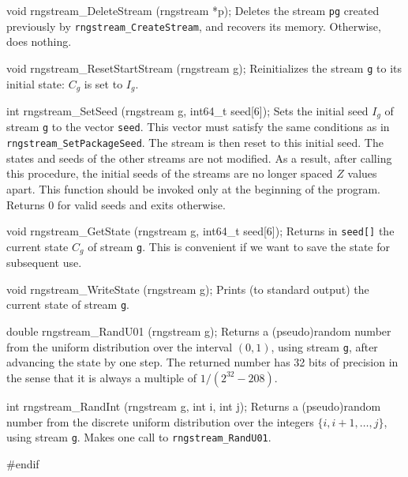 void rngstream_DeleteStream (rngstream *p);
\endcode
 \tab Deletes the stream {\tt *pg} created previously
  by {\tt rngstream\_CreateStream}, and recovers its memory.
  Otherwise, does nothing.
 \endtab
\code

void rngstream_ResetStartStream (rngstream g);
\endcode
 \tab Reinitializes the stream {\tt g} to its initial state:
   $C_g$ is set to $I_g$.
 \endtab
\code

int rngstream_SetSeed (rngstream g, int64_t seed[6]);
\endcode
 \tab  Sets the initial seed $I_g$ of stream {\tt g}
  to the vector {\tt seed}.  This vector must satisfy the same
  conditions as in {\tt rngstream\_SetPackageSeed}.
  The stream is then reset to this initial seed.
  The states and seeds of the other streams are not modified.
  As a result, after calling this procedure, the initial seeds
  of the streams are no longer spaced $Z$ values apart.
  This function should be invoked only at the beginning of the program.
  Returns 0 for valid seeds and exits otherwise.
 \endtab
\code

void rngstream_GetState (rngstream g, int64_t seed[6]);
\endcode
 \tab Returns in {\tt seed[]} the current state $C_g$ of stream {\tt g}.
  This is convenient if we want to save the state for subsequent use.
 \endtab
\code

void rngstream_WriteState (rngstream g);
\endcode
 \tab Prints (to standard output) the current state of stream {\tt g}.
 \endtab
\code

double rngstream_RandU01 (rngstream g);
\endcode
 \tab Returns a (pseudo)random number from the uniform distribution
   over the interval $(0,1)$, using stream {\tt g},
   after advancing the state by one step.
   The returned number has 32 bits of precision in the sense that it is
   always a multiple of $1/(2^{32}-208)$.
 \endtab
\code

int rngstream_RandInt (rngstream g, int i, int j);
\endcode
 \tab Returns a (pseudo)random number from the discrete uniform
   distribution over the integers $\{i,i+1,\dots,j\}$, using stream {\tt g}.
   Makes one call to {\tt rngstream\_RandU01}.
 \endtab
\code\hide

#endif
\endhide
\endcode
